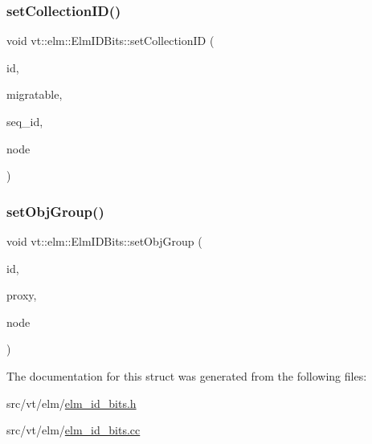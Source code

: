 \mbox{\label{structvt_1_1elm_1_1_elm_i_d_bits_abb1902f29d879e417ed307409a7a185f}} 
\subsubsection{\texorpdfstring{set\+Collection\+I\+D()}{setCollectionID()}}
{\footnotesize\ttfamily void vt\+::elm\+::\+Elm\+I\+D\+Bits\+::set\+Collection\+ID (\begin{DoxyParamCaption}\item[{\hyperlink{namespacevt_1_1elm_a63afb64985b41b7b6dcf2f01336391f8}{Element\+I\+D\+Type} \&}]{id,  }\item[{bool}]{migratable,  }\item[{\hyperlink{namespacevt_1_1elm_a63afb64985b41b7b6dcf2f01336391f8}{Element\+I\+D\+Type}}]{seq\+\_\+id,  }\item[{\hyperlink{namespacevt_a866da9d0efc19c0a1ce79e9e492f47e2}{Node\+Type}}]{node }\end{DoxyParamCaption})\hspace{0.3cm}{\ttfamily [static]}}

\mbox{\label{structvt_1_1elm_1_1_elm_i_d_bits_a0d8c4b097e14d441eb4c000a45eb83b3}} 
\subsubsection{\texorpdfstring{set\+Obj\+Group()}{setObjGroup()}}
{\footnotesize\ttfamily void vt\+::elm\+::\+Elm\+I\+D\+Bits\+::set\+Obj\+Group (\begin{DoxyParamCaption}\item[{\hyperlink{namespacevt_1_1elm_a63afb64985b41b7b6dcf2f01336391f8}{Element\+I\+D\+Type} \&}]{id,  }\item[{\hyperlink{namespacevt_ad7cae989df485fccca57f0792a880a8e}{Obj\+Group\+Proxy\+Type}}]{proxy,  }\item[{\hyperlink{namespacevt_a866da9d0efc19c0a1ce79e9e492f47e2}{Node\+Type}}]{node }\end{DoxyParamCaption})\hspace{0.3cm}{\ttfamily [static]}}



The documentation for this struct was generated from the following files\+:\begin{DoxyCompactItemize}
\item 
src/vt/elm/\hyperlink{elm__id__bits_8h}{elm\+\_\+id\+\_\+bits.\+h}\item 
src/vt/elm/\hyperlink{elm__id__bits_8cc}{elm\+\_\+id\+\_\+bits.\+cc}\end{DoxyCompactItemize}
